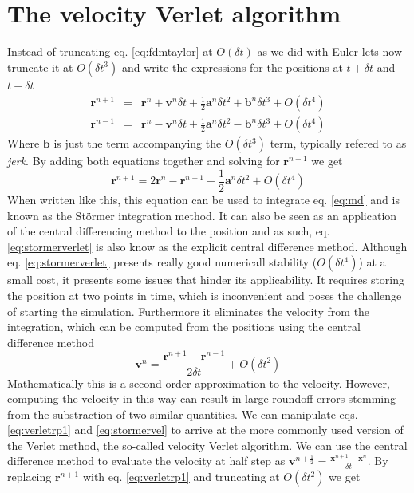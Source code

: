 \documentclass[ twoside,openright,titlepage,numbers=noenddot,%
headinclude,footinclude,cleardoublepage=empty,abstract=on,
BCOR=5mm,paper=a4,fontsize=11pt, dvipsnames
]{scrreprt}
\renewcommand{\vec}[1]{\bm{#1}}
\newcommand{\dt}{\delta t}
\newcommand{\half}{\frac{1}{2}}
\begin{document}
\section{The velocity Verlet algorithm}\label{sec:velocityverlet}
Instead of truncating eq. \eqref{eq:fdmtaylor} at $O(\dt)$ as we did with Euler lets now truncate it at $O(\dt^3)$ and write the expressions for the positions at $t+\dt$ and $t-\dt$
\begin{eqnarray}
  \label{eq:verletrp1}
  \vec{r}^{n+1} &=& \vec{r}^n + \vec{v}^n\dt + \half\vec{a}^n\dt^2 + \vec{b}^n\dt^3 + O(\dt^4)\\
  \vec{r}^{n-1} &=& \vec{r}^n - \vec{v}^n\dt + \half\vec{a}^n\dt^2 - \vec{b}^n\dt^3 + O(\dt^4)
\end{eqnarray}
Where $\vec{b}$ is just the term accompanying the $O(\dt^3)$ term, typically refered to as \emph{jerk}.
By adding both equations together and solving for $\vec{r}^{n+1}$ we get
\begin{equation}
  \label{eq:stormerverlet}
  \vec{r}^{n+1} = 2\vec{r}^n - \vec{r}^{n-1} + \half\vec{a}^n\dt^2 + O(\dt^4)
\end{equation}
When written like this, this equation can be used to integrate eq. \eqref{eq:md} and is known as the Störmer integration method. It can also be seen as an application of the central differencing method to the position and as such, eq. \eqref{eq:stormerverlet} is also know as the explicit central difference method.
Although eq. \eqref{eq:stormerverlet} presents really good numericall stability ($O(\dt^4)$) at a small cost, it presents some issues that hinder its applicability.
It requires storing the position at two points in time, which is inconvenient and poses the challenge of starting the simulation.
Furthermore it eliminates the velocity from the integration, which can be computed from the positions using the central difference method
\begin{equation}
  \label{eq:stormervel}
  \vec{v}^n = \frac{\vec{r} ^{n+1} - \vec{r}^{n-1}}{2\dt} + O(\dt^2)
\end{equation}
Mathematically this is a second order approximation to the velocity. However, computing the velocity in this way can result in large roundoff errors stemming from the substraction of two similar quantities.
We can manipulate eqs. \eqref{eq:verletrp1} and \eqref{eq:stormervel} to arrive at the more commonly used version of the Verlet method, the so-called velocity Verlet algorithm.
We can use the central difference method to evaluate the velocity at half step as $\vec{v}^{n+\half} = \frac{\vec{x}^{n+1} - \vec{x}^n}{\dt}$. By replacing $\vec{r}^{n+1}$ with eq. \eqref{eq:verletrp1} and truncating at $O(\dt^2)$ we get
\end{document}
